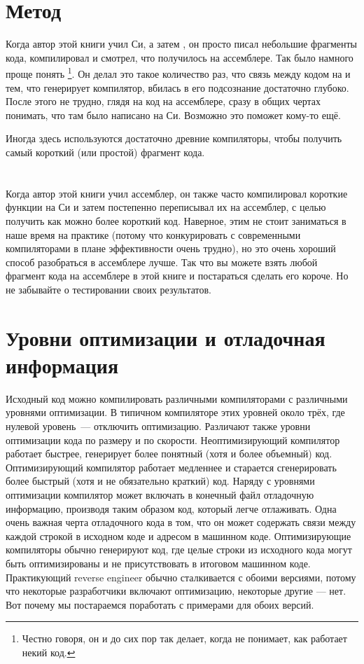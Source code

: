 \section{Метод}

Когда автор этой книги учил Си, а затем \Cpp, он просто писал небольшие фрагменты кода, компилировал и смотрел, что 
получилось на ассемблере. Так было намного проще понять%
\footnote{Честно говоря, он и до сих пор так делает, когда не понимает, как работает некий код.}.
Он делал это такое количество раз, что связь между кодом на \CCpp и тем, что генерирует компилятор, вбилась в его подсознание достаточно глубоко.
После этого не трудно, глядя на код на ассемблере, сразу в общих чертах понимать, что там было написано на Си. 
Возможно это поможет кому-то ещё.


Иногда здесь используются достаточно древние компиляторы, чтобы получить самый короткий (или простой) фрагмент кода.

\section*{\Exercises}

Когда автор этой книги учил ассемблер, он также часто компилировал короткие функции на Си и затем постепенно 
переписывал их на ассемблер, с целью получить как можно более короткий код.
Наверное, этим не стоит заниматься в наше время на практике (потому что конкурировать с современными
компиляторами в плане эффективности очень трудно), но это очень хороший способ разобраться в ассемблере
лучше.
Так что вы можете взять любой фрагмент кода на ассемблере в этой книге и постараться сделать его короче.
Но не забывайте о тестировании своих результатов.

\section*{Уровни оптимизации и отладочная информация}

Исходный код можно компилировать различными компиляторами с различными уровнями оптимизации.
В типичном компиляторе этих уровней около трёх, где нулевой уровень~--- отключить оптимизацию.
Различают также уровни оптимизации кода по размеру и по скорости.
Неоптимизирующий компилятор работает быстрее, генерирует более понятный (хотя и более объемный) код.
Оптимизирующий компилятор работает медленнее и старается сгенерировать более быстрый (хотя и не обязательно краткий) код.
Наряду с уровнями оптимизации компилятор может включать в конечный файл отладочную информацию,
производя таким образом код, который легче отлаживать.
Одна очень важная черта отладочного кода в том, что он может содержать
связи между каждой строкой в исходном коде и адресом в машинном коде.
Оптимизирующие компиляторы обычно генерируют код, где целые строки из исходного кода
могут быть оптимизированы и не присутствовать в итоговом машинном коде.
Практикующий reverse engineer обычно сталкивается с обоими версиями, потому что некоторые разработчики
включают оптимизацию, некоторые другие --- нет. Вот почему мы постараемся поработать с примерами для обоих версий.
